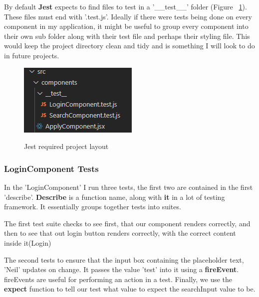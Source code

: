 By default \textbf{Jest} expects to find files to test in a '\_\_test\_\_' folder (Figure ~\ref{test4_label}). These files must end with '.test.js'. Ideally if there were tests being done on every component in my application, it might be useful to group every component into their own sub folder along with their test file and perhaps their styling file. This would keep the project directory clean and tidy and is something I will look to do in future projects.

\begin{figure}[ht]
    \centering
    \includegraphics[scale=0.8]{Images/test4.png} 
    \label{test4_label}
    \caption{Jest required project layout}
\end{figure}

\subsubsection{LoginComponent Tests}
In the 'LoginComponent' I run three tests, the first two are contained in the first 'describe'. \textbf{Describe} is a function name, along with \textbf{it} in a lot of testing framework. It essentially groups together tests into suites.

The first test suite checks to see first, that our component renders correctly, and then to see that out login button renders correctly, with the correct content inside it(Login)

The second tests to ensure that the input box containing the placeholder text, 'Neil' updates on change. It passes the value 'test' into it using a \textbf{fireEvent}. fireEvents are useful for performing an action in a test. Finally, we use the \textbf{expect} function to tell our test what value to expect the searchInput value to be.

